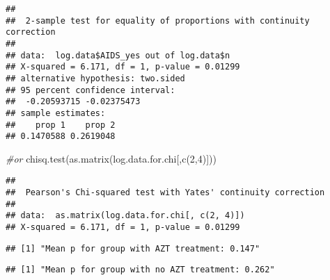 \documentclass[
]{article}
\newenvironment{Shaded}{\begin{snugshade}}{\end{snugshade}}
\newcommand{\CommentTok}[1]{\textcolor[rgb]{0.56,0.35,0.01}{\textit{#1}}}
\newcommand{\DecValTok}[1]{\textcolor[rgb]{0.00,0.00,0.81}{#1}}
\newcommand{\DocumentationTok}[1]{\textcolor[rgb]{0.56,0.35,0.01}{\textbf{\textit{#1}}}}
\newcommand{\FunctionTok}[1]{\textcolor[rgb]{0.00,0.00,0.00}{#1}}
\newcommand{\NormalTok}[1]{#1}
\newcommand{\SpecialCharTok}[1]{\textcolor[rgb]{0.00,0.00,0.00}{#1}}
\newcommand{\StringTok}[1]{\textcolor[rgb]{0.31,0.60,0.02}{#1}}
\begin{document}
\begin{verbatim}
## 
##  2-sample test for equality of proportions with continuity correction
## 
## data:  log.data$AIDS_yes out of log.data$n
## X-squared = 6.171, df = 1, p-value = 0.01299
## alternative hypothesis: two.sided
## 95 percent confidence interval:
##  -0.20593715 -0.02375473
## sample estimates:
##    prop 1    prop 2 
## 0.1470588 0.2619048
\end{verbatim}

\begin{Shaded}
\begin{Highlighting}[]
\CommentTok{\#or}
\FunctionTok{chisq.test}\NormalTok{(}\FunctionTok{as.matrix}\NormalTok{(log.data.for.chi[,}\FunctionTok{c}\NormalTok{(}\DecValTok{2}\NormalTok{,}\DecValTok{4}\NormalTok{)]))}
\end{Highlighting}
\end{Shaded}

\begin{verbatim}
## 
##  Pearson's Chi-squared test with Yates' continuity correction
## 
## data:  as.matrix(log.data.for.chi[, c(2, 4)])
## X-squared = 6.171, df = 1, p-value = 0.01299
\end{verbatim}

\begin{Shaded}
\end{Shaded}

\begin{verbatim}
## [1] "Mean p for group with AZT treatment: 0.147"
\end{verbatim}

\begin{Shaded}
\end{Shaded}

\begin{verbatim}
## [1] "Mean p for group with no AZT treatment: 0.262"
\end{verbatim}
\end{document}
